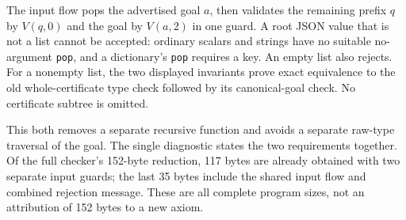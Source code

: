 The input flow pops the advertised goal $a$, then validates the
remaining prefix $q$ by $V(q,0)$ and the goal by $V(a,2)$ in one
guard. A root JSON value that is not a list cannot be accepted:
ordinary scalars and strings have no suitable no-argument
\texttt{pop}, and a dictionary's \texttt{pop} requires a key.
An empty list also rejects. For a nonempty list, the two displayed
invariants prove exact equivalence to the old whole-certificate
type check followed by its canonical-goal check. No certificate
subtree is omitted.

This both removes a separate recursive function and avoids a
separate raw-type traversal of the goal. The single diagnostic
states the two requirements together. Of the full checker's
152-byte reduction, 117 bytes are already obtained with two
separate input guards; the last 35 bytes include the shared
input flow and combined rejection message. These are all complete
program sizes, not an attribution of 152 bytes to a new axiom.

